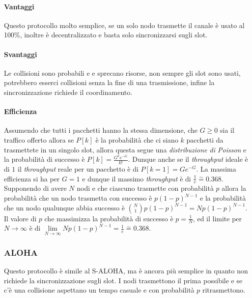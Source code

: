             \paragraph{Vantaggi} Questo protocollo molto semplice, se un solo nodo trasmette il canale è usato al 100\%, inoltre è decentralizzato e basta solo sincronizzarsi sugli slot.
            \paragraph{Svantaggi} Le collisioni sono probabili e e sprecano risorse, non sempre gli slot sono usati, potrebbero esserci collisioni senza la fine di una trasmissione, infine la sincronizzazione richiede il coordinamento.
            \paragraph{Efficienza} Assumendo che tutti i pacchetti hanno la stessa dimensione, che $G\geq 0$ sia il traffico offerto allora se $P[k]$ è la probabilità che ci siano $k$ pacchetti da trasmettete in un singolo slot, allora questa segue una \textit{distribuzione di Poisson} e la probabilità di successo è $P[k]=\frac{G^ke^{-G}}{k!}$. Dunque anche se il \textit{throughput} ideale è di $1$ il \textit{throughput} reale per un pacchetto è di $P[k=1]=Ge^{-G}$. La massima efficienza si ha per $G=1$ e dunque il massimo \textit{throughput} è di $\frac{1}{e}\stackrel{\sim}{=} 0.368$. \newline
            Supponendo di avere $N$ nodi e che ciascuno trasmette con probabilità $p$ allora la probabilità che un nodo trasmetta con successo è $p(1-p)^{N-1}$ e la probabilità che un nodo qualunque abbia successo è $\binom{N}{1}p(1-p)^{N-1} = Np(1-p)^{N-1}$. Il valore di $p$ che massimizza la probabilità di successo è $p=\frac{1}{N}$, ed il limite per $N\to\infty$ è di $\lim\limits_{N\to\infty}Np(1-p)^{N-1}=\frac{1}{e}\stackrel{\sim}{=}0.368$.
        \subsubsection{\Acrlong*{ALOHA}}
            Questo protocollo è simile al \Acrlong*{S-ALOHA}, ma è ancora più semplice in quanto non richiede la sincronizzazione sugli slot. I nodi trasmettono il prima possibile e se c'è una collisione aspettano un tempo casuale e con probabilità $p$ ritrasmettono.
